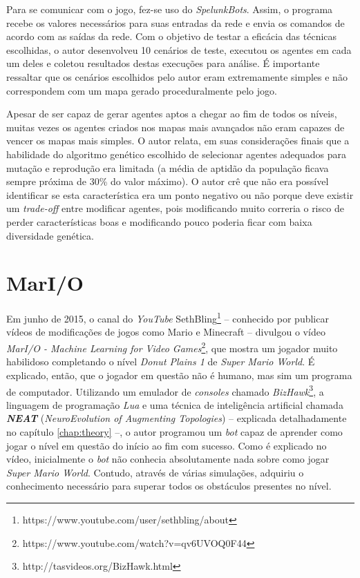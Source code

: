 Para se comunicar com o jogo, fez-se uso do \textit{SpelunkBots}. Assim, o
programa recebe os valores necessários para suas entradas da rede e envia os
comandos de acordo com as saídas da rede. Com o objetivo de testar a eficácia
das técnicas escolhidas, o autor desenvolveu 10 cenários de teste, executou os
agentes em cada um deles e coletou resultados destas execuções para análise. É
importante ressaltar que os cenários escolhidos pelo autor eram extremamente
simples e não correspondem com um mapa gerado proceduralmente pelo jogo.

Apesar de ser capaz de gerar agentes aptos a chegar ao fim de todos os níveis,
muitas vezes os agentes criados nos mapas mais avançados não eram capazes de
vencer os mapas mais simples. O autor relata, em suas considerações finais que a
habilidade do algoritmo genético escolhido de selecionar agentes adequados para
mutação e reprodução era limitada (a média de aptidão da população ficava sempre
próxima de 30\% do valor máximo). O autor crê que não era possível identificar
se esta característica era um ponto negativo ou não porque deve existir um
\textit{trade-off} entre modificar agentes, pois modificando muito correria o
risco de perder características boas e modificando pouco poderia ficar com baixa
diversidade genética. 


\section{MarI/O}
Em junho de 2015, o canal do \textit{YouTube}
SethBling\footnote{https://www.youtube.com/user/sethbling/about} -- conhecido
por publicar vídeos de modificações de jogos como Mario e Minecraft -- divulgou
o vídeo \textit{MarI/O - Machine Learning for Video
Games}\footnote{https://www.youtube.com/watch?v=qv6UVOQ0F44}, que mostra um
jogador muito habilidoso completando o nível \textit{Donut Plains 1} de
\textit{Super Mario World}. É explicado, então, que o jogador em questão não é
humano, mas sim um programa de computador. Utilizando um emulador de
\textit{consoles} chamado
\textit{BizHawk}\footnote{http://tasvideos.org/BizHawk.html}, a linguagem de
programação \textit{Lua} e uma técnica de inteligência artificial chamada
\textit{\textbf{NEAT}} (\textit{NeuroEvolution of Augmenting Topologies})
\cite{stanley:ec02} -- explicada detalhadamente no capítulo \ref{chap:theory}
--, o autor programou um \textit{bot} capaz de aprender como jogar o nível em
questão do início ao fim com sucesso. Como é explicado no vídeo, inicialmente o
\textit{bot} não conhecia absolutamente nada sobre como jogar \textit{Super
Mario World}. Contudo, através de várias simulações, adquiriu o conhecimento
necessário para superar todos os obstáculos presentes no nível.

